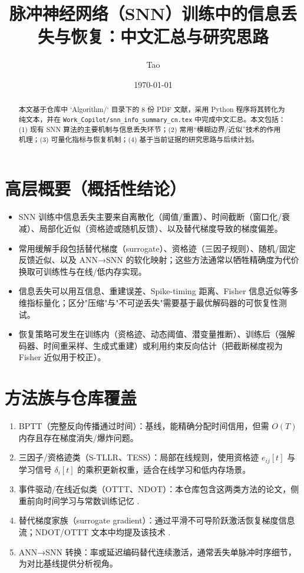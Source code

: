 \documentclass[journal,12pt,onecolumn]{IEEEtran}
\begin{document}
\title{脉冲神经网络（SNN）训练中的信息丢失与恢复：中文汇总与研究思路}
\author{Tao}
\date{\today}
\maketitle

\begin{abstract}
本文基于仓库中 `Algorithm/` 目录下的 8 份 PDF 文献，采用 Python 程序将其转化为纯文本，并在 \texttt{Work\_Copilot/snn\_info\_summary\_cn.tex} 中完成中文汇总。本文包括：(1) 现有 SNN 算法的主要机制与信息丢失环节；(2) 常用“模糊边界/近似”技术的作用机理；(3) 可量化指标与恢复机制；(4) 基于当前证据的研究思路与后续计划。
\end{abstract}

\section{高层概要（概括性结论）}
\begin{itemize}
  \item SNN 训练中信息丢失主要来自离散化（阈值/重置）、时间截断（窗口化/衰减）、局部化近似（资格迹或随机反馈）、以及替代梯度导致的梯度偏差。\
  \item 常用缓解手段包括替代梯度（surrogate）、资格迹（三因子规则）、随机/固定反馈近似、以及 ANN→SNN 的软化映射；这些方法通常以牺牲精确度为代价换取可训练性与在线/低内存实现。\
  \item 信息丢失可以用互信息、重建误差、Spike-timing 距离、Fisher 信息近似等多维指标量化；区分"压缩"与"不可逆丢失"需要基于最优解码器的可恢复性测试。\
  \item 恢复策略可发生在训练内（资格迹、动态阈值、潜变量推断）、训练后（强解码器、时间重采样、生成式重建）或利用约束反向估计（把截断梯度视为 Fisher 近似用于校正）。
\end{itemize}

\section{方法族与仓库覆盖}
\begin{enumerate}
  \item BPTT（完整反向传播通过时间）：基线，能精确分配时间信用，但需 $O(T)$ 内存且存在梯度消失/爆炸问题。
  \item 三因子/资格迹类（S‑TLLR、TESS）：局部在线规则，使用资格迹 $e_{ij}[t]$ 与学习信号 $\delta_i[t]$ 的乘积更新权重，适合在线学习和低内存场景。\
  \item 事件驱动/在线近似类（OTTT、NDOT）：本仓库包含这两类方法的论文，侧重前向时间学习与常数训练记忆 \cite{jiang2024ndot,xiao2022online}.\
  \item 替代梯度家族（surrogate gradient）：通过平滑不可导阶跃激活恢复梯度信息流；NDOT/OTTT 文本中均提及该技术 \cite{xiao2022online}.\
  \item ANN→SNN 转换：率或延迟编码替代连续激活，通常丢失单脉冲时序细节，为对比基线提供分析视角。
\end{enumerate}
\end{document}
